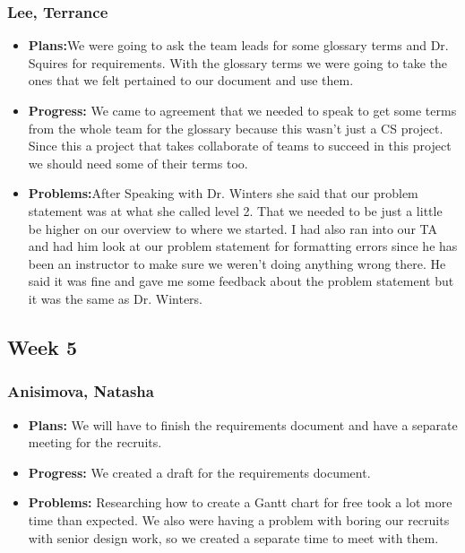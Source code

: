 \documentclass[10pt,draftclsnofoot,onecolumn]{IEEEtran}
\begin{document}
\subsubsection{Lee, Terrance}
\begin{itemize}
	\item \textbf{Plans:}We were going to ask the team leads for some glossary terms and Dr. Squires for requirements. With the glossary terms we were going to take the ones that we felt pertained to our document and use them.
	\item \textbf{Progress:} We came to agreement that we needed to speak to get some terms from the whole team for the glossary because this wasn't just a CS project. Since this a project that takes collaborate of teams to succeed in this project we should need some of their terms too.
	\item \textbf{Problems:}After Speaking with Dr. Winters she said that our problem statement was at what she called level 2. That we needed to be just a little be higher on our overview to where we started. I had also ran into our TA and had him look at our problem statement for formatting errors since he has been an instructor to make sure we weren't doing anything wrong there. He said it was fine and gave me some feedback about the problem statement but it was the same as Dr. Winters.
\end{itemize}
\subsection{Week 5}
\subsubsection{Anisimova, Natasha}
\begin{itemize}
	\item \textbf{Plans: }
	We will have to finish the requirements document and have a separate meeting for the recruits.
	\item \textbf{Progress: }
	We created a draft for the requirements document.
	\item \textbf{Problems: }
	Researching how to create a Gantt chart for free took a lot more time than expected. We also were
	having a problem with boring our recruits with senior design work, so we created a separate time to meet with them.
\end{itemize}
\end{document}
